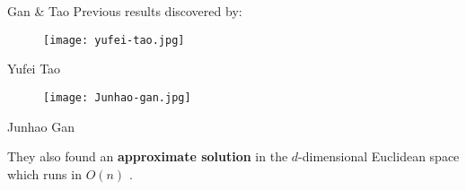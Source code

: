 \documentclass[aspectratio=169]{beamer}
\begin{document}
\begin{comment}
\begin{frame}{Hardness of exact DBSCAN}

    All these results cover the Euclidean space, for a general metric space we could assume that the algorithm is $O(n^2)$.

    The problem is much harder than it seemed at first.
    
\end{frame}

\end{comment}
\begin{comment}
\begin{frame}{Recap}

    open problems: spazi ad alte dimensioni + spazi metrici generali
\end{frame}
\end{comment}

\begin{frame}{Gan \& Tao}
    Previous results discovered by:
    \vspace{0.3cm}
    
    \begin{minipage}[b]{0.45\textwidth}
    \centering
        \begin{figure}
            \centering
            \texttt{[image: yufei-tao.jpg]}
        \end{figure}
        Yufei Tao
    \end{minipage}
    \hfill
    \begin{minipage}[b]{0.45\textwidth}
    \centering
        \begin{figure}
            \centering
            \texttt{[image: Junhao-gan.jpg]}
        \end{figure}
        Junhao Gan
    \end{minipage}

    \vspace{0.3cm}
    
    They also found an \textbf{approximate solution} in the $d$-dimensional Euclidean space which runs in $O(n)$ \cite{follow_up}.
\end{frame}

\begin{comment}
\begin{frame}{Approximate Solution}
    In computer science, when a problem is too hard, we start looking for \textbf{approximate solutions}. 

    In our case it is apparently difficult to define an approximate solution, since DBSCAN is not an optimization problem.

    We will not approximate on the value of the solution, instead we will try to find a clustering that is in some sense approximately equal to the clustering we want to find.
\end{frame}
\end{comment}
\end{document}
